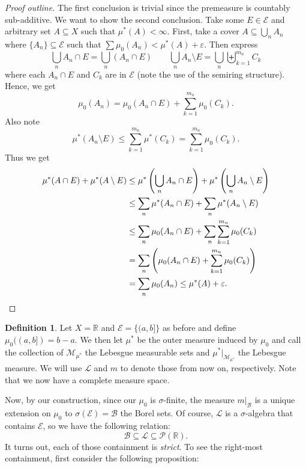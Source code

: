 \documentclass[letterpaper,12pt]{article}
\theoremstyle{definition}
\newtheorem{definition}{Definition}[section]
\theoremstyle{plain}
\theoremstyle{remark}
\newcommand{\R}{\mathbb{R}}
\begin{document}
\begin{proof}[Proof outline]
The first conclusion is trivial since the premeasure is countably sub-additive. We want to show the second conclusion. Take some $E\in \mathcal{E}$ and arbitrary set $A\subseteq X$ such that $\mu^*(A)<\infty$. First, take a cover $A\subseteq \bigcup_n A_n$ where $\{A_n\}\subseteq \mathcal{E}$ such that $\sum \mu_0(A_n)<\mu^*(A)+\varepsilon$. Then express
\[\bigcup_nA_n\cap E = \bigcup_n (A_n\cap E)\qquad \bigcup_n A_n\setminus E = \bigcup_n\biguplus_{k=1}^{m_n}C_k\]
where each $A_n\cap E$ and $C_k$ are in $\mathcal{E}$ (note the use of the semiring structure). Hence, we get
\[\mu_0(A_n) = \mu_0(A_n\cap E) + \sum_{k=1}^{m_n}\mu_0(C_k).\]
Also note
\[\mu^*(A_n\setminus E)\leq \sum_{k=1}^{m_n}\mu^*(C_k) = \sum_{k=1}^{m_n}\mu_0(C_k).\]
Thus we get
\begin{align*}
\mu^*(A\cap E) + \mu^*(A\setminus E) &\leq \mu^* \left(\bigcup_n A_n\cap E\right)+\mu^* \left(\bigcup_n A_n\setminus E\right) \\
& \leq \sum_n \mu^*(A_n\cap E) + \sum_n \mu^*(A_n\setminus E) \\
& \leq \sum_n \mu_0(A_n\cap E) + \sum_n\sum_{k=1}^{m_n}\mu_0(C_k) \\
& = \sum_n \left(\mu_0(A_n\cap E) + \sum_{k=1}^{m_n}\mu_0(C_k)\right) \\
& =\sum_n \mu_0(A_n) \leq \mu^*(A)+\varepsilon.\qedhere
\end{align*}
\end{proof}

\begin{definition}
Let $X=\R$ and $\mathcal{E} = \{(a,b]\}$ as before and define $\mu_0((a,b])=b-a$. We then let $\mu^*$ be the outer measure induced by $\mu_0$ and call the collection of $\mathcal{M}_{\mu^*}$ the Lebesgue measurable sets and $\mu^*\big|_{\mathcal{M}_{\mu^*}}$ the Lebesgue measure. We will use $\mathcal{L}$ and $m$ to denote those from now on, respectively. Note that we now have a complete measure space.
\end{definition}

Now, by our construction, since our $\mu_0$ is $\sigma$-finite, the measure $m\big|_{\mathcal{B}}$ is a unique extension on $\mu_0$ to $\sigma(\mathcal{E}) = \mathcal{B}$ the Borel sets. Of course, $\mathcal{L}$ is a $\sigma$-algebra that contains $\mathcal{E}$, so we have the following relation:
\[
\mathcal{B}\subseteq \mathcal{L}\subseteq \mathcal{P}(\R).
\]
It turns out, each of those containment is \emph{strict}. To see the right-most containment, first consider the following proposition:
\end{document}
